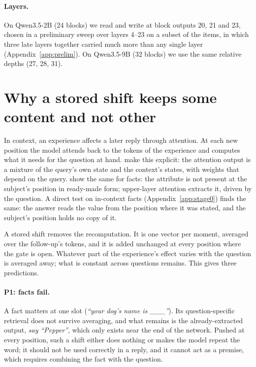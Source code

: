 \documentclass[11pt]{article}
\begin{document}
\paragraph{Layers.} On Qwen3.5-2B (24 blocks) we read and write at block outputs 20, 21 and 23, chosen in a preliminary sweep over layers 4--23 on a subset of the items, in which three late layers together carried much more than any single layer (Appendix~\ref{app:prelim}). On Qwen3.5-9B (32 blocks) we use the same relative depths (27, 28, 31).

\section{Why a stored shift keeps some content and not other}
\label{sec:theory}

In context, an experience affects a later reply through attention. At each new position the model attends back to the tokens of the experience and computes what it needs for the question at hand. \citet{liu2024icv} make this explicit: the attention output is a mixture of the query's own state and the context's states, with weights that depend on the query. \citet{geva2023dissecting} show the same for facts: the attribute is not present at the subject's position in ready-made form; upper-layer attention extracts it, driven by the question. A direct test on in-context facts (Appendix~\ref{app:stage0}) finds the same: the answer reads the value from the position where it was stated, and the subject's position holds no copy of it.

A stored shift removes the recomputation. It is one vector per moment, averaged over the follow-up's tokens, and it is added unchanged at every position where the gate is open. Whatever part of the experience's effect varies with the question is averaged away; what is constant across questions remains. This gives three predictions.

\paragraph{P1: facts fail.} A fact matters at one slot (\textit{``your dog's name is \_\_\_''}). Its question-specific retrieval does not survive averaging, and what remains is the already-extracted output, \textit{say ``Pepper''}, which only exists near the end of the network. Pushed at every position, such a shift either does nothing or makes the model repeat the word; it should not be used correctly in a reply, and it cannot act as a premise, which requires combining the fact with the question.
\end{document}

